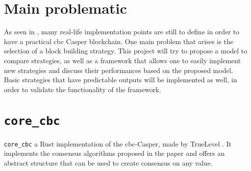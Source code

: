 \begin{table}[H]
\end{table}

\section{Main problematic}
As seen in , many real-life implementation points are still
to define in order to have a practical \gls{cbc} Casper blockchain. One main
problem that arises is the selection of a block building strategy. This project
will try to propose a model to compare strategies, as well as a framework that
allows one to easily implement new strategies and discuss their performances
based on the proposed model.
Basic strategies that have predictable outputs will be implemented as well, in
order to validate the functionality of the framework.

\section{\texttt{core\_cbc}}
\texttt{core\_cbc} a Rust implementation of the \gls{cbc}-Casper, made by
TrueLevel . It implements the consensus algorithms proposed in the paper and
offers an abstract structure that can be used to create consensus on any value.

